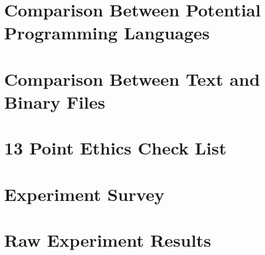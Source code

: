 \documentclass[11pt,openright,twoside,a4paper]{report}
\begin{document}


\let\cleardoublepage\clearpage %
\appendix

\chapter{Comparison Between Potential Programming Languages}
\label{ch:appendix-comparison-programming-languages}


\chapter{Comparison Between Text and Binary Files}
\label{ch:appendix-comparison-text-vs-binary}


\chapter{13 Point Ethics Check List}
\label{ch:appendix-ethics-checklist}


\chapter{Experiment Survey}
\label{ch:appendix-experiment-survey}


\chapter{Raw Experiment Results}
\label{ch:appendix-survey-results}





\end{document}
